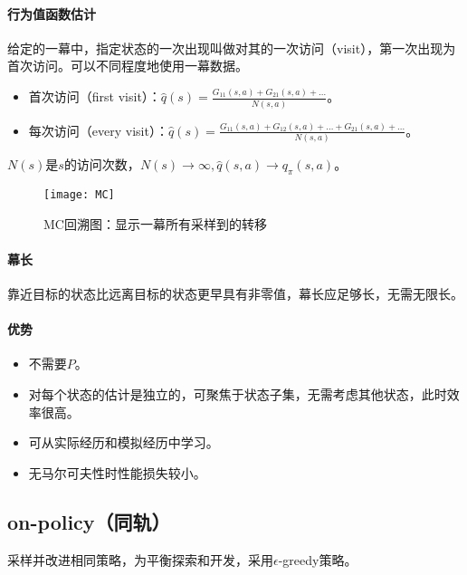 \documentclass[
12pt, %
a4paper, 
oneside, %
headinclude,footinclude, %
]{scrartcl}
\begin{document}
\paragraph{行为值函数估计}
给定的一幕中，指定状态的一次出现叫做对其的一次访问（visit），第一次出现为首次访问。可以不同程度地使用一幕数据。
\begin{itemize}
\item 首次访问（first visit）：$ \hat{q}(s) = \frac{G_{11}(s, a) + G_{21}(s, a) + \dots}{N(s, a)} $。
\item 每次访问（every visit）：$ \hat{q}(s) = \frac{G_{11}(s, a) + G_{12}(s, a) + \dots + G_{21}(s, a) + \dots}{N(s, a)} $。
\end{itemize}

$ N(s) $是$ s $的访问次数，$ N(s) \to \infty, \hat{q}(s, a) \to q_{\pi}(s, a) $。

\begin{figure}[H]
\centering 
\texttt{[image: MC]} 
\caption[MC回溯图：显示一幕所有采样到的转移]{MC回溯图：显示一幕所有采样到的转移}
\end{figure}
\paragraph{幕长}
靠近目标的状态比远离目标的状态更早具有非零值，幕长应足够长，无需无限长。
\paragraph{优势}
\begin{itemize}
\item 不需要$ P $。
\item 对每个状态的估计是独立的，可聚焦于状态子集，无需考虑其他状态，此时效率很高。
\item 可从实际经历和模拟经历中学习。
\item 无马尔可夫性时性能损失较小。
\end{itemize}
\subsection[on-policy]{on-policy（同轨）}
采样并改进相同策略，为平衡探索和开发，采用$ \epsilon $-greedy策略。
\end{document}
